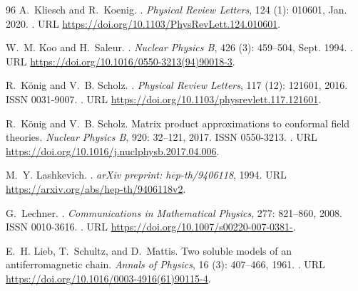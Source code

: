 \documentclass[a4paper, 11pt]{article}
\DeclareMathOperator{\1}{\mathds{1}}
\begin{document}
\begin{thebibliography}{96}
A.~Kliesch and R.~Koenig.
.
\newblock \emph{Physical Review Letters}, 124 (1): 010601,
  Jan. 2020.
\newblock {}.
\newblock URL \url{https://doi.org/10.1103/PhysRevLett.124.010601}.

W.~M. Koo and H.~Saleur.
.
\newblock \emph{Nuclear Physics B}, 426 (3): 459--504, Sept.
  1994.
\newblock {}.
\newblock URL \url{https://doi.org/10.1016/0550-3213(94)90018-3}.

R.~König and V.~B. Scholz.
.
\newblock \emph{Physical Review Letters}, 117 (12): 121601,
  2016.
\newblock ISSN 0031-9007.
\newblock {}.
\newblock URL \url{https://doi.org/10.1103/physrevlett.117.121601}.

R.~König and V.~B. Scholz.
\newblock Matrix product approximations to conformal field theories.
\newblock \emph{Nuclear Physics B}, 920: 32--121, 2017.
\newblock ISSN 0550-3213.
\newblock {}.
\newblock URL \url{https://doi.org/10.1016/j.nuclphysb.2017.04.006}.

M.~Y. Lashkevich.
.
\newblock \emph{arXiv preprint: hep-th/9406118}, 1994.
\newblock URL \url{https://arxiv.org/abs/hep-th/9406118v2}.

G.~Lechner.
.
\newblock \emph{Communications in Mathematical Physics}, 277:
  821--860, 2008.
\newblock ISSN 0010-3616.
\newblock {}.
\newblock URL \url{https://doi.org/10.1007/s00220-007-0381-}.

E.~H. Lieb, T.~Schultz, and D.~Mattis.
\newblock Two soluble models of an antiferromagnetic chain.
\newblock \emph{Annals of Physics}, 16 (3): 407--466, 1961.
\newblock {}.
\newblock URL \url{https://doi.org/10.1016/0003-4916(61)90115-4}.


\end{thebibliography}
\end{document}
